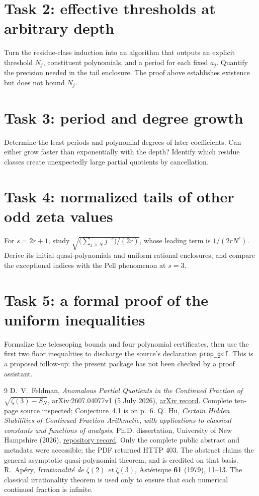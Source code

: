 \documentclass[11pt]{article}
\begin{document}
\section*{Task 2: effective thresholds at arbitrary depth}
Turn the residue-class induction into an algorithm that outputs an
explicit threshold $N_j$, constituent polynomials, and a period for
each fixed $a_j$. Quantify the precision needed in the tail enclosure.
The proof above establishes existence but does not bound $N_j$.

\section*{Task 3: period and degree growth}
Determine the least periods and polynomial degrees of later
coefficients. Can either grow faster than exponentially with the
depth? Identify which residue classes create unexpectedly large
partial quotients by cancellation.

\section*{Task 4: normalized tails of other odd zeta values}
For $s=2r+1$, study
$\sqrt{\bigl(\sum_{j>N}j^{-s}\bigr)/(2r)}$, whose leading term is
$1/(2rN^r)$. Derive its initial quasi-polynomials and uniform rational
enclosures, and compare the exceptional indices with the Pell
phenomenon at $s=3$.

\section*{Task 5: a formal proof of the uniform inequalities}
Formalize the telescoping bounds and four polynomial certificates,
then use the first two floor inequalities to discharge the source's
declaration \texttt{prop\_gcf}. This is a proposed follow-up:
the present package has not been checked by a proof assistant.

\begin{thebibliography}{9}
 D.~V.~Feldman,
\emph{Anomalous Partial Quotients in the Continued Fraction of
$\sqrt{\zeta(3)-S_N}$}, arXiv:2607.04077v1 (5 July 2026),
\href{https://arxiv.org/abs/2607.04077}{arXiv record}.
Complete ten-page source inspected; Conjecture~4.1 is on p.~6.
 Q.~Hu, \emph{Certain Hidden Stabilities of Continued
Fraction Arithmetic, with applications to classical constants and
functions of analysis}, Ph.D. dissertation, University of New Hampshire
(2026), \href{https://scholars.unh.edu/dissertation/2988/}{repository record}.
Only the complete public abstract and metadata were accessible;
the PDF returned HTTP 403. The abstract claims the general asymptotic
quasi-polynomial theorem, and is credited on that basis.
 R.~Ap\'ery, \emph{Irrationalit\'e de $\zeta(2)$ et $\zeta(3)$},
Ast\'erisque \textbf{61} (1979), 11--13.
The classical irrationality theorem is used only to ensure that
each numerical continued fraction is infinite.
\end{thebibliography}
\end{document}
